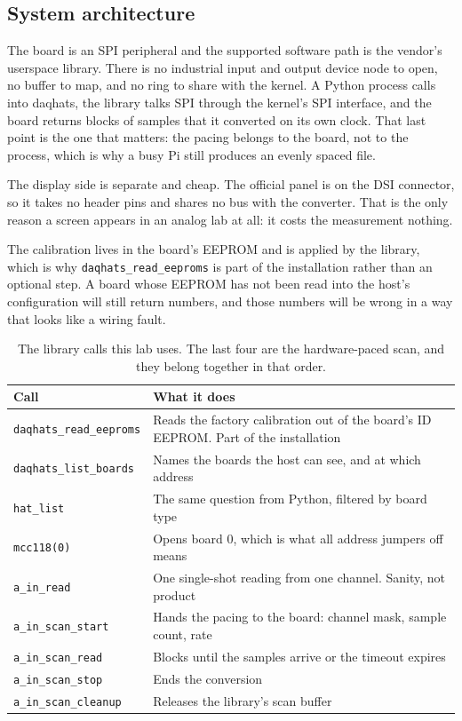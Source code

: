 \subsection*{System architecture}


The board is an SPI peripheral and the supported software path is the vendor's userspace library. There is no industrial input and output device node to open, no buffer to map, and no ring to share with the kernel. A Python process calls into daqhats, the library talks SPI through the kernel's SPI interface, and the board returns blocks of samples that it converted on its own clock. That last point is the one that matters: the pacing belongs to the board, not to the process, which is why a busy Pi still produces an evenly spaced file.

The display side is separate and cheap. The official panel is on the DSI connector, so it takes no header pins and shares no bus with the converter. That is the only reason a screen appears in an analog lab at all: it costs the measurement nothing.

The calibration lives in the board's EEPROM and is applied by the library, which is why \texttt{daqhats\_read\_eeproms} is part of the installation rather than an optional step. A board whose EEPROM has not been read into the host's configuration will still return numbers, and those numbers will be wrong in a way that looks like a wiring fault.

\begin{table}[H]\centering\small
\begin{tabular}{p{44mm}p{102mm}}
\toprule
Call & What it does \\
\midrule
\texttt{daqhats\_read\_eeproms} & Reads the factory calibration out of the board's ID EEPROM. Part of the installation \\
\texttt{daqhats\_list\_boards} & Names the boards the host can see, and at which address \\
\texttt{hat\_list} & The same question from Python, filtered by board type \\
\texttt{mcc118(0)} & Opens board 0, which is what all address jumpers off means \\
\texttt{a\_in\_read} & One single-shot reading from one channel. Sanity, not product \\
\texttt{a\_in\_scan\_start} & Hands the pacing to the board: channel mask, sample count, rate \\
\texttt{a\_in\_scan\_read} & Blocks until the samples arrive or the timeout expires \\
\texttt{a\_in\_scan\_stop} & Ends the conversion \\
\texttt{a\_in\_scan\_cleanup} & Releases the library's scan buffer \\
\bottomrule
\end{tabular}
\caption{The library calls this lab uses. The last four are the hardware-paced scan, and they belong together in that order.}
\end{table}

